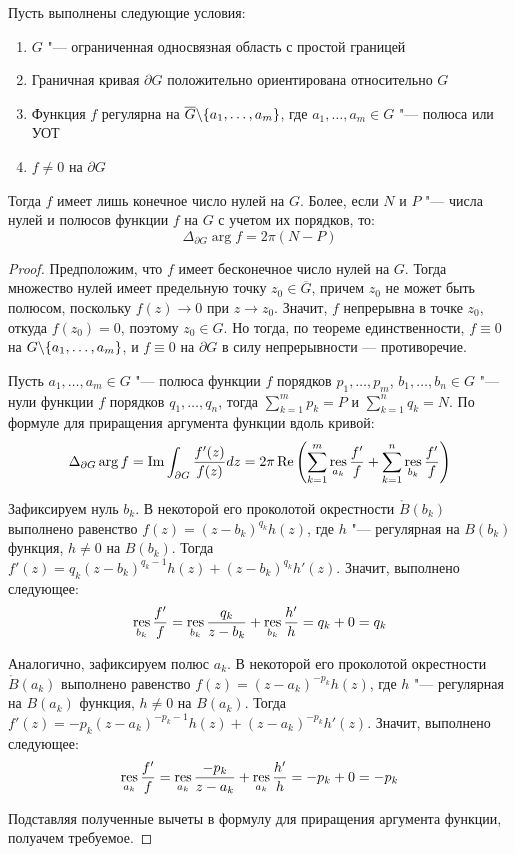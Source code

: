 
\begin{theorem}
	Пусть выполнены следующие условия:
	\begin{enumerate}
		\item $G$ "--- ограниченная односвязная область с простой границей
		
		\item Граничная кривая $\partial G$ положительно ориентирована относительно $G$
		
		\item Функция $f$ регулярна на $\overline{G} \backslash \{a_1, \dotsc, a_m\}$, где $a_1, \dotsc, a_m \in G$ "--- полюса или УОТ
		
		\item $f \ne 0$ на $\partial G$
	\end{enumerate}
	
	Тогда $f$ имеет лишь конечное число нулей на $G$. Более, если $N$ и $P$ "--- числа нулей и полюсов функции $f$ на $G$ с учетом их порядков, то:
	\[\Delta_{\partial G} \arg f = 2\pi (N - P)\]
\end{theorem}

\begin{proof}
	Предположим, что $f$ имеет бесконечное число нулей на $G$. Тогда множество нулей имеет предельную точку $z_0 \in \overline{G}$, причем $z_0$ не может быть полюсом, поскольку $f(z) \to 0$ при $z \to z_0$. Значит, $f$ непрерывна в точке $z_0$, откуда $f(z_0) = 0$, поэтому $z_0 \in G$. Но тогда, по теореме единственности, $f \equiv 0$ на $G \backslash \{a_1, \dotsc, a_m\}$, и $f \equiv 0$ на $\partial G$ в силу непрерывности --- противоречие.
	
	Пусть $a_1, \dotsc, a_m \in G$ "--- полюса функции $f$ порядков $p_1, \dotsc, p_m$, $b_1, \dots, b_n \in G$ "--- нули функции $f$ порядков $q_1, \dotsc, q_n$, тогда $\sum_{k = 1}^mp_k = P$ и $\sum_{k = 1}^nq_k = N$. По формуле для приращения аргумента функции вдоль кривой:
	\[\Delta_{\partial G} \arg f = \operatorname{Im}\int_{\partial G}\frac{f'(z)}{f(z)}dz = 2\pi\operatorname{Re} \left(\sum_{k = 1}^m\operatorname*{res}_{a_k}\frac{f'}{f} + \sum_{k = 1}^n\operatorname*{res}_{b_k}\frac{f'}{f}\right)\]
	
	Зафиксируем нуль $b_k$. В некоторой его проколотой окрестности $\mathring B(b_k)$ выполнено равенство
 $f(z) = (z-b_k)^{q_k}h(z)$, где $h$ "--- регулярная на $B(b_k)$ функция, $h \ne 0$ на $B(b_k)$. Тогда $f'(z) = q_k(z-b_k)^{q_k - 1}h(z) + (z-b_k)^{q_k}h'(z)$. Значит, выполнено следующее:
	\[\operatorname*{res}_{b_k}\frac{f'}{f} = \operatorname*{res}_{b_k}\frac{q_k}{z-b_k} + \operatorname*{res}_{b_k}\frac{h'}{h} = q_k + 0 = q_k\]
	
	Аналогично, зафиксируем полюс $a_k$. В некоторой его проколотой окрестности $\mathring B(a_k)$ выполнено равенство $f(z) = (z-a_k)^{-p_k}h(z)$, где $h$ "--- регулярная на $B(a_k)$ функция, $h \ne 0$ на $B(a_k)$. Тогда $f'(z) = -p_k(z-a_k)^{-p_k - 1}h(z) + (z-a_k)^{-p_k}h'(z)$. Значит, выполнено следующее:
	\[\operatorname*{res}_{a_k}\frac{f'}{f} = \operatorname*{res}_{a_k}\frac{-p_k}{z-a_k} + \operatorname*{res}_{a_k}\frac{h'}{h} = -p_k + 0 = -p_k\]
	
	Подставляя полученные вычеты в формулу для приращения аргумента функции, полуачем требуемое.
\end{proof}

